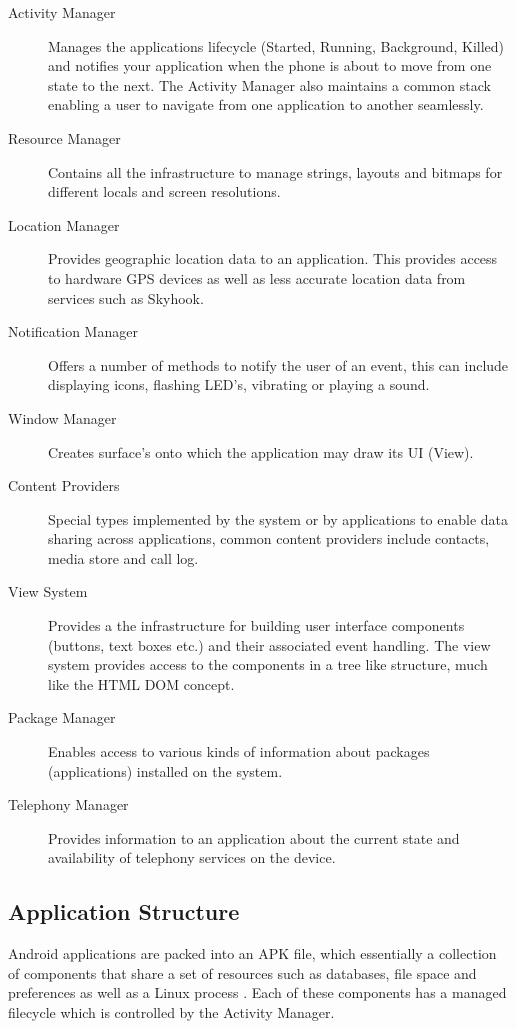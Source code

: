 \begin{description}
\item[Activity Manager] Manages the applications lifecycle (Started, Running, Background, Killed) and notifies your application when the phone is about to move from one state to the next. The Activity Manager also maintains a common stack enabling a user to navigate from one application to another seamlessly.
\item[Resource Manager] Contains all the infrastructure to manage strings, layouts and bitmaps for different locals and screen resolutions.
\item[Location Manager] Provides geographic location data to an application. This provides access to hardware GPS devices as well as less accurate location data from services such as Skyhook.
\item[Notification Manager] Offers a number of methods to notify the user of an event, this can include displaying icons, flashing LED’s, vibrating or playing a sound.
\item[Window Manager] Creates surface’s onto which the application may draw its UI (View).
\item[Content Providers] Special types implemented by the system or by applications to enable data sharing across applications, common content providers include contacts, media store and call log.
\item[View System] Provides a the infrastructure for building user interface components (buttons, text boxes etc.) and their associated event handling. The view system provides access to the components in a tree like structure, much like the HTML DOM concept.
\item[Package Manager] Enables access to various kinds of information about packages (applications) installed on the system.
\item[Telephony Manager] Provides information to an application about the current state and availability of telephony services on the device. 
\end{description}


\subsection{Application Structure}

Android applications are packed into an APK file, which essentially a collection of components that share a set of resources such as databases, file space and preferences as well as a Linux process \cite{googioappframework08}. Each of these components has a managed filecycle which is controlled by the Activity Manager.

